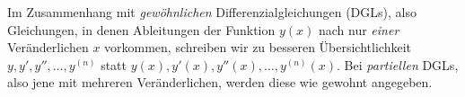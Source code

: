 \documentclass[12pt,a4paper]{article}
\date{23.06.2023}
\begin{document}
Im Zusammenhang mit \textit{gewöhnlichen} Differenzialgleichungen (DGLs), also Gleichungen, in denen Ableitungen der Funktion $y(x)$ nach nur \textit{einer} Veränderlichen $x$ vorkommen, schreiben wir zu besseren Übersichtlichkeit $y, y', y'', \ldots, y^{(n)}$ statt $y(x), y'(x), y''(x), \ldots, y^{(n)}(x)$. 
Bei \textit{partiellen} DGLs, also jene mit mehreren Veränderlichen, werden diese wie gewohnt angegeben.


\pagebreak

\pagebreak
%
\end{document}
